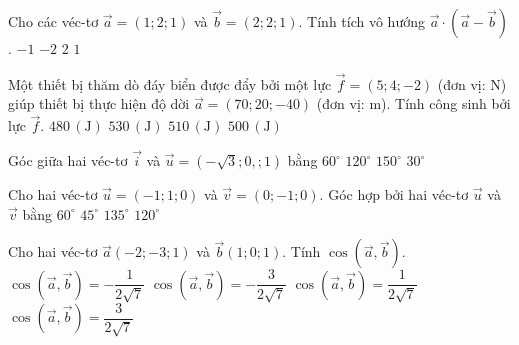 \begin{ex}
	Cho các véc-tơ $\vec{a}=(1;2;1)$ và $\vec{b}=(2;2;1)$. Tính tích vô hướng $\vec{a} \cdot \left(\vec{a}-\vec{b}\right)$.
	\choice
	{\True $-1$}
	{$-2$}
	{$2$}
	{$1$}
\end{ex} 

\begin{ex}
	Một thiết bị thăm dò đáy biển được đẩy bởi một lực $\overrightarrow{f} = (5; 4; -2)$ (đơn vị: N) giúp thiết bị thực hiện độ dời $\overrightarrow{a} = (70; 20; -40)$ (đơn vị: m). Tính công sinh bởi lực $\overrightarrow{f}$.
	\choice
	{$480\,(\text{J})$}
	{$530\,(\text{J})$}
	{\True $510\,(\text{J})$}
	{$500\,(\text{J})$}
\end{ex} 

\begin{ex}
	Góc giữa hai véc-tơ $ \vec{i} $ và $ \vec{u}=(-\sqrt{3};0,;1) $ bằng
	\choice
	{$ 60^\circ $}
	{$ 120^\circ $}
	{\True $ 150^\circ $}
	{$ 30^\circ $}
\end{ex} 

\begin{ex}
	Cho hai véc-tơ $ \vec{u}=(-1;1;0) $ và $ \vec{v}=(0;-1;0) $. Góc hợp bởi hai véc-tơ $ \vec{u} $ và $ \vec{v} $ bằng
	\choice
	{$ 60^\circ $}
	{$ 45^\circ $}
	{\True $ 135^\circ $}
	{$ 120^\circ $}
\end{ex} 

\begin{ex}
	Cho hai véc-tơ $ \vec{a}(-2;-3;1) $ và $ \vec{b}(1;0;1) $. Tính $ \cos(\vec{a},\vec{b}) $.
	\choice
	{\True $ \cos(\vec{a},\vec{b})=-\dfrac{1}{2\sqrt{7}} $}
	{$ \cos(\vec{a},\vec{b})=-\dfrac{3}{2\sqrt{7}} $}
	{$ \cos(\vec{a},\vec{b})=\dfrac{1}{2\sqrt{7}} $}
	{$ \cos(\vec{a},\vec{b})=\dfrac{3}{2\sqrt{7}} $}
\end{ex} 

